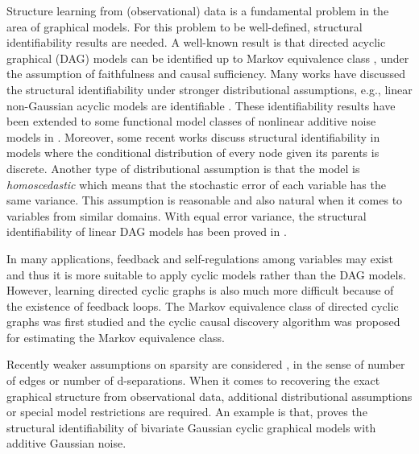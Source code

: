 \documentclass[12pt,reqno]{amsart}
\theoremstyle{plain}
\theoremstyle{definition}
\begin{document}
Structure learning from (observational) data is a fundamental problem in the area of graphical models. For this problem to be well-defined, structural identifiability results are needed. A well-known result is that directed acyclic graphical (DAG) models can be identified up to Markov equivalence class \cite{pearl:2009,spirtes:2000}, under the assumption of faithfulness and causal sufficiency. 
Many works have discussed the structural identifiability under stronger distributional assumptions, e.g., linear non-Gaussian acyclic models are identifiable \cite{Shimizu06alinear}. These identifiability results have been  extended to some functional model classes of nonlinear additive noise models in \cite{NIPS2008_f7664060,Peters11identifiabilityof}. Moreover, some recent works \cite{NIPS2015_fccb60fb,pmlr-v89-park19a} discuss structural identifiability in models where the conditional distribution of every node given its parents is discrete. Another type of distributional assumption is that the model is \emph{homoscedastic} which means that the stochastic error of each variable has the same variance. This assumption is reasonable and also natural when it comes to variables from similar domains. With equal error variance, the structural identifiability of linear DAG models has been proved in \cite{ideneqPeters,eqvar/biomet/asz049}.

In many applications, feedback and self-regulations among variables may exist and thus it is more suitable to apply cyclic models rather than the DAG models. However, learning directed cyclic graphs is also much more difficult because of the existence of feedback loops. The Markov equivalence class of directed cyclic graphs was first studied \cite{Richardson96Algorithm,Richardson96Equivalence} and the cyclic causal discovery algorithm was proposed for estimating the Markov equivalence class.

Recently weaker assumptions on sparsity are considered \cite{park2016identifiability}, in the sense of number of edges or number of d-separations. When it comes to recovering the exact graphical structure from observational data, additional distributional assumptions or special model restrictions are required. An example is that, \cite{NIPS2011_idenbivarite} proves the structural identifiability of bivariate Gaussian cyclic graphical models with additive Gaussian noise.
\end{document}
